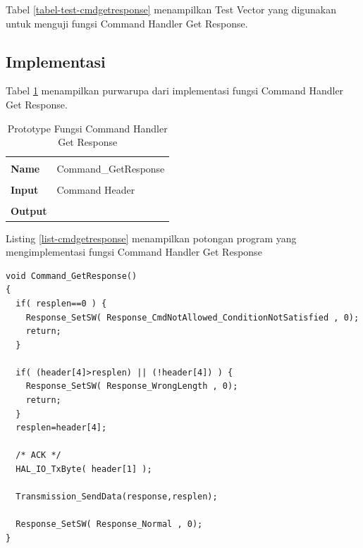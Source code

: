 Tabel \ref{tabel-test-cmdgetresponse} menampilkan Test Vector yang digunakan untuk menguji fungsi Command Handler Get Response.

\subsection {Implementasi}

Tabel \ref{tabel-cmdgetresponse} menampilkan purwarupa dari implementasi fungsi Command Handler Get Response.

\begin{table}[h]
  \centering
  \begin{tabular}{p{2cm} p{8cm}}
    \hline\\
    {\bf Name} & Command\_GetResponse\\
    \hline\\
    {\bf Input} & Command Header
    \\
    \hline\\
    {\bf Output} & 
    \\
    \hline
  \end{tabular}
  \caption{Prototype Fungsi Command Handler Get Response}
  \label{tabel-cmdgetresponse}
\end{table}

Listing \ref{list-cmdgetresponse} menampilkan potongan program yang mengimplementasi fungsi Command Handler Get Response

\begin{lstlisting}[caption={Listing Program Fungsi Command Handler Get Response}, label={list_cmdgetresponse}]
void Command_GetResponse()
{
  if( resplen==0 ) {
    Response_SetSW( Response_CmdNotAllowed_ConditionNotSatisfied , 0);
    return;
  }

  if( (header[4]>resplen) || (!header[4]) ) {
    Response_SetSW( Response_WrongLength , 0);
    return;
  }
  resplen=header[4];

  /* ACK */
  HAL_IO_TxByte( header[1] );

  Transmission_SendData(response,resplen);

  Response_SetSW( Response_Normal , 0);
}
\end{lstlisting}


